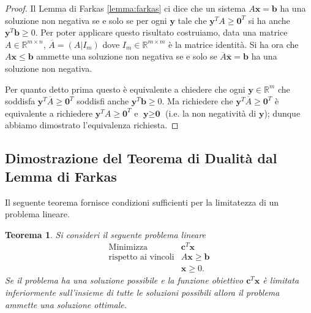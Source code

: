 \documentclass[italian, letter paper, 12pt, reqno]{article}
\theoremstyle{myteo}
\newtheorem{theorem}{Teorema}[section]
\numberwithin{equation}{section}
\begin{document}
\begin{proof}
  Il Lemma di Farkas \ref{lemma:farkas} ci dice che un sistema \(A \textbf{x}= \textbf{b}\) ha una soluzione non negativa se e solo se per ogni \(\textbf{y}\) tale che \(\textbf{y}^TA \geq \textbf{0}^T\) si ha anche \(\textbf{y}^T \textbf{b} \geq 0\).
  Per poter applicare questo risultato costruiamo, data una matrice \(A\in \mathbb{R}^{m\times n}\), \(\overline{A}= (A|I_m)\) dove \(I_m\in \mathbb{R}^{m\times m}\) è la matrice identità.
  Si ha ora che \(A \textbf{x} \leq \textbf{b}\) ammette una soluzione non negativa se e solo se \(\overline{A} \mathbf{\overline{x}} = \textbf{b}\) ha una soluzione non negativa.

  Per quanto detto prima questo è equivalente a chiedere che ogni \(\textbf{y}\in \mathbb{R}^m\) che soddisfa \(\mathbf{y}^T\overline{A} \geq \textbf{0}^T\) soddisfi anche \(\mathbf{y}^T \textbf{b} \geq 0\).
  Ma richiedere che \(\textbf{y}^T\overline{A} \geq \textbf{0}^T\) è equivalente a richiedere \(\textbf{y}^TA \geq \textbf{0}^T\) e \(\textbf{y} \geq \textbf{0}\) (i.e. la non negatività di \(\textbf{y}\)); dunque abbiamo dimostrato l'equivalenza richiesta.
\end{proof}

\subsection{Dimostrazione del Teorema di Dualità dal Lemma di Farkas}
\label{subsec:dim_dualità}

Il seguente teorema fornisce condizioni sufficienti per la limitatezza di un problema lineare.

\begin{theorem}
  \label{teo:condizioni_sufficienti}
  Si consideri il seguente problema lineare
  \begin{equation*}
    \begin{array}{ll}
      \text{Minimizza} & \mathbf{c}^T\mathbf{x}\\
      \text{rispetto ai vincoli} & A\mathbf{x} \ge \mathbf{b}\\
                        & \mathbf{x} \ge 0.
    \end{array}
  \end{equation*}
  Se il problema ha una soluzione possibile e la funzione obiettivo \(\mathbf{c}^T\mathbf{x}\) è limitata \emph{inferiormente} sull'insieme di tutte le soluzioni possibili allora il problema ammette una soluzione ottimale.
\end{theorem}
\end{document}
